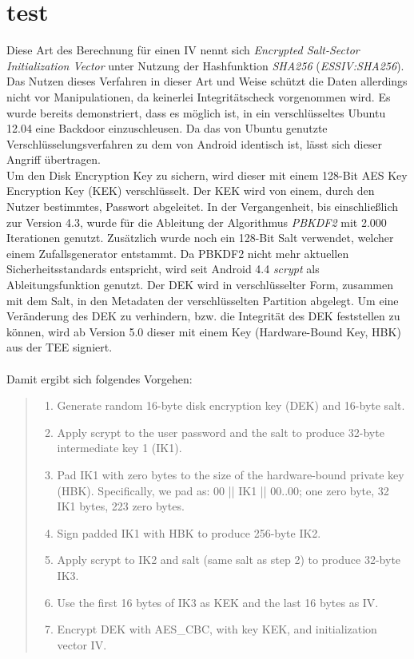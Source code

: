 \chapter{test}
	Diese Art des Berechnung für einen IV nennt sich \textit{Encrypted Salt-Sector Initialization Vector} unter Nutzung der Hashfunktion \textit{SHA256} (\textit{ESSIV:SHA256}).\cite[S. 259]{Elenkov2014} Das Nutzen dieses Verfahren in dieser Art und Weise schützt die Daten allerdings nicht vor Manipulationen, da keinerlei Integritätscheck vorgenommen wird. Es wurde bereits demonstriert, dass es möglich ist, in ein verschlüsseltes Ubuntu 12.04 eine Backdoor einzuschleusen. Da das von Ubuntu genutzte Verschlüsselungsverfahren zu dem von Android identisch ist, lässt sich dieser Angriff übertragen. \cite{Jakob}\\
	Um den Disk Encryption Key zu sichern, wird dieser mit einem 128-Bit AES Key Encryption Key (KEK) verschlüsselt. Der KEK wird von einem, durch den Nutzer bestimmtes, Passwort abgeleitet. In der Vergangenheit, bis einschließlich zur Version 4.3, wurde für die Ableitung der Algorithmus \textit{PBKDF2} mit 2.000 Iterationen genutzt. Zusätzlich wurde noch ein 128-Bit Salt verwendet, welcher einem Zufallsgenerator entstammt. Da PBKDF2 nicht mehr aktuellen Sicherheitsstandards entspricht, wird seit Android 4.4 \textit{scrypt} als Ableitungsfunktion genutzt. Der DEK wird in verschlüsselter Form, zusammen mit dem Salt, in den Metadaten der verschlüsselten Partition abgelegt. Um eine Veränderung des DEK zu verhindern, bzw. die Integrität des DEK feststellen zu können, wird ab Version 5.0 dieser mit einem Key (Hardware-Bound Key, HBK) aus der TEE signiert. \\\\
	Damit ergibt sich folgendes Vorgehen:
	\begin{quote}
		\begin{enumerate}
		   \item Generate random 16-byte disk encryption key (DEK) and 16-byte salt.
		   \item Apply scrypt to the user password and the salt to produce 32-byte intermediate key 1 (IK1).
		   \item Pad IK1 with zero bytes to the size of the hardware-bound private key (HBK). Specifically, we pad as: 00 || IK1 || 00..00; one zero byte, 32 IK1 bytes, 223 zero bytes.
		   \item Sign padded IK1 with HBK to produce 256-byte IK2.
		   \item Apply scrypt to IK2 and salt (same salt as step 2) to produce 32-byte IK3.
		   \item Use the first 16 bytes of IK3 as KEK and the last 16 bytes as IV.
		   \item Encrypt DEK with AES\_CBC, with key KEK, and initialization vector IV. 
	   \end{enumerate}
	   \cite{AndroidCrypt}
	\end{quote}
